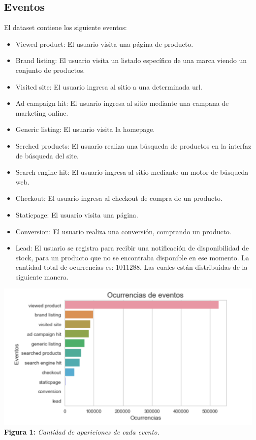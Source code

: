 \documentclass[titlepage,a4paper]{article}
\begin{document}
	\subsection{Eventos}
	El dataset contiene los siguiente eventos: 
	\begin{itemize}
	\item Viewed product: El usuario visita una página de producto.
	\item Brand listing: El usuario visita un listado específico de una marca viendo un conjunto de productos.
	\item Visited site: El usuario ingresa al sitio a una determinada url.
	\item Ad campaign hit:  El usuario ingresa al sitio mediante una campana de marketing online.
	\item Generic listing:  El usuario visita la homepage.
	\item Serched products:  El usuario realiza una búsqueda de productos en la interfaz de búsqueda del site.
	\item Search engine hit: El usuario ingresa al sitio mediante un motor de búsqueda web.
	\item Checkout: El usuario ingresa al checkout de compra de un producto.
	\item Staticpage: El usuario visita una página.
	\item Conversion: El usuario realiza una conversión, comprando un producto.
	\item Lead: El usuario se registra para recibir una notificación de disponibilidad de stock, para un producto que no se encontraba disponible en ese momento.
	\newpage
	La cantidad total de ocurrencias es:	1011288. Las cuales están distribuidas de la siguiente manera. 
	\end{itemize}
	\begin{center}
	\includegraphics[width=15cm]{ocurrencia_eventos.jpg}\\
	\textbf{Figura 1:}  \textit{Cantidad de apariciones de cada evento. }
	\end{center}
\end{document}
